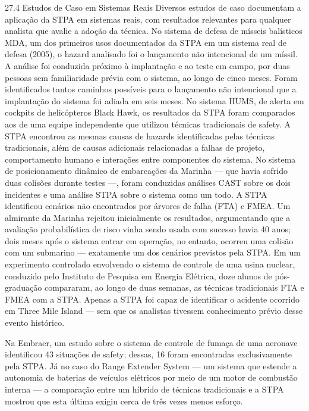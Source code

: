 27.4 Estudos de Caso em Sistemas Reais Diversos estudos de caso documentam a aplicação da STPA em sistemas reais, com resultados relevantes para qualquer analista que avalie a adoção da técnica. No sistema de defesa de mísseis balísticos MDA, um dos primeiros usos documentados da STPA em um sistema real de defesa (2005), o hazard analisado foi o lançamento não intencional de um míssil. A análise foi conduzida próximo à implantação e ao teste em campo, por duas pessoas sem familiaridade prévia com o sistema, ao longo de cinco meses. Foram identificados tantos caminhos possíveis para o lançamento não intencional que a implantação do sistema foi adiada em seis meses. No sistema HUMS, de alerta em cockpits de helicópteros Black Hawk, os resultados da STPA foram comparados aos de uma equipe independente que utilizou técnicas tradicionais de safety. A STPA encontrou as mesmas causas de hazards identificadas pelas técnicas tradicionais, além de causas adicionais relacionadas a falhas de projeto, comportamento humano e interações entre componentes do sistema. No sistema de posicionamento dinâmico de embarcações da Marinha — que havia sofrido duas colisões durante testes —, foram conduzidas análises CAST sobre os dois incidentes e uma análise STPA sobre o sistema como um todo. A STPA identificou cenários não encontrados por árvores de falha (FTA) e FMEA. Um almirante da Marinha rejeitou inicialmente os resultados, argumentando que a avaliação probabilística de risco vinha sendo usada com sucesso havia 40 anos; dois meses após o sistema entrar em operação, no entanto, ocorreu uma colisão com um submarino — exatamente um dos cenários previstos pela STPA. Em um experimento controlado envolvendo o sistema de controle de uma usina nuclear, conduzido pelo Instituto de Pesquisa em Energia Elétrica, doze alunos de pós-graduação compararam, ao longo de duas semanas, as técnicas tradicionais FTA e FMEA com a STPA. Apenas a STPA foi capaz de identificar o acidente ocorrido em Three Mile Island — sem que os analistas tivessem conhecimento prévio desse evento histórico.

Na Embraer, um estudo sobre o sistema de controle de fumaça de uma aeronave identificou 43 situações de safety; dessas, 16 foram encontradas exclusivamente pela STPA. Já no caso do Range Extender System — um sistema que estende a autonomia de baterias de veículos elétricos por meio de um motor de combustão interna — a comparação entre um híbrido de técnicas tradicionais e a STPA mostrou que esta última exigiu cerca de três vezes menos esforço.

